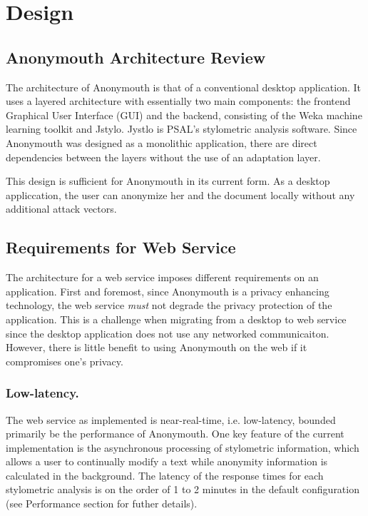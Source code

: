 \documentclass[letterpaper]{article}
\begin{document}
\section{Design}

\subsection{Anonymouth Architecture Review}

The architecture of Anonymouth is that of a conventional desktop
application.  It uses a layered architecture with essentially two main
components: the frontend Graphical User Interface (GUI) and the
backend, consisting of the Weka machine learning toolkit and Jstylo.
Jystlo is PSAL's stylometric analysis software.   Since Anonymouth was
designed as a monolithic application, there are direct dependencies
between the layers without the use of an adaptation layer.

This design is sufficient for Anonymouth in its current form.  As a
desktop appliccation, the user can anonymize her and the document
locally without any additional attack vectors.

\subsection{Requirements for Web Service}

The architecture for a web service imposes different requirements on
an application.  First and foremost, since Anonymouth is a privacy
enhancing technology, the web service \emph{must} not degrade the
privacy protection of the application.  This is a challenge when
migrating from a desktop to web service since the desktop application
does not use any networked communicaiton.  However, there is little
benefit to using Anonymouth on the web if it compromises one's
privacy.

\subsubsection{Low-latency.}
The web service as implemented is near-real-time, i.e. low-latency,
bounded primarily be the performance of Anonymouth. One key feature of
the current implementation is the asynchronous processing of
stylometric information, which allows a user to continually modify a
text while anonymity information is calculated in the background. The
latency of the response times for each stylometric analysis is on the
order of 1 to 2 minutes in the default configuration (see Performance
section for futher details).
\end{document}
